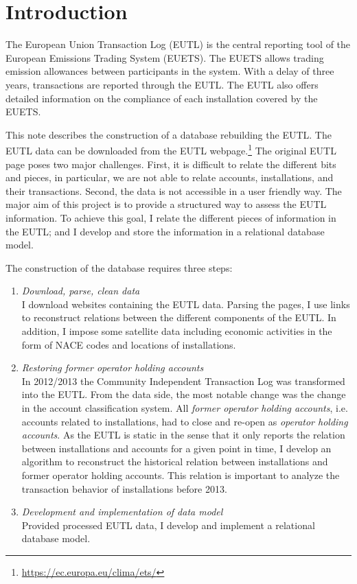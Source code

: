 \documentclass[authoryear]{elsarticle}
\begin{document}
\section{Introduction}\label{sec:introduction}
The European Union Transaction Log (EUTL) is the central reporting tool of the European Emissions Trading System (EUETS). The EUETS allows trading emission allowances between participants in the system. With a delay of three years, transactions are reported through the EUTL. The EUTL also offers detailed information on the compliance of each installation covered by the EUETS. 
	
This note describes the construction of a database rebuilding the EUTL. The EUTL data can be downloaded from the EUTL webpage.\footnote{\url{https://ec.europa.eu/clima/ets/}} The original EUTL page poses two major challenges. First, it is difficult to relate the different bits and pieces, in particular, we are not able to relate accounts, installations, and their transactions. Second, the data is not accessible in a user friendly way. The major aim of this project is to provide a structured way to assess the EUTL information. To achieve this goal, I relate the different pieces of information in the EUTL; and I develop and store the information in a relational database model.

The construction of the database requires three steps:
\begin{enumerate}
	\item \textit{Download, parse, clean data}\\ I download websites containing the EUTL data. Parsing the pages, I use links to reconstruct relations between the different components of the EUTL. In addition, I impose some satellite data including economic activities in the form of NACE codes and locations of installations.   
	\item \textit{Restoring former operator holding accounts}\\ In 2012/2013 the Community Independent Transaction Log was transformed into the EUTL. From the data side, the most notable change was the change in the account classification system. All \textit{former operator holding accounts}, i.e. accounts related to installations, had to close and re-open as \textit{operator holding accounts}. As the EUTL is static in the sense that it only reports the relation between installations and accounts for a given point in time, I develop an algorithm to reconstruct the historical relation between installations and former operator holding accounts. This relation is important to analyze the transaction behavior of installations before 2013. 
	\item \textit{Development and implementation of data model}\\ Provided processed EUTL data, I develop and implement a relational database model. 
\end{enumerate} 
\end{document}
